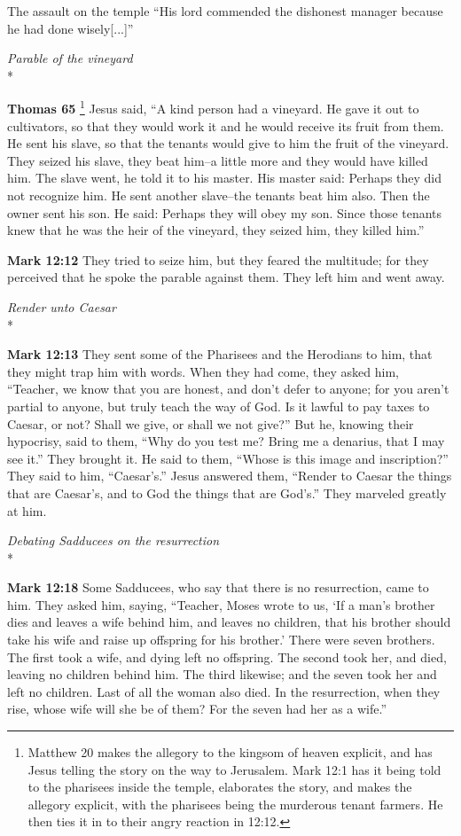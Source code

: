 \documentclass[10pt,twoside]{article} %
\newcommand{\quotesize}{\normalsize{}}
\newenvironment{quotetext}{\begingroup\quotesize}{\endgroup}
\newcommand{\intex}[1]{\index[texts]{#1}}
\newcommand{\bible}[2]{\begin{quotetext}\textbf{#1}\intex{#1} #2\end{quotetext}}
\newcommand{\gospelmark}[2]{\bible{Mark #1}{#2}}
\newcommand{\thomas}[2]{\bible{Thomas #1}{#2}}
\newcommand{\subhead}[1]{\emph{#1}\\*}
\begin{document}
\begin{section}{The assault on the temple}
{   ``His lord commended the dishonest manager because he had done wisely[...]''
}

\subhead{Parable of the vineyard}

\thomas{65}{\footnote{Matthew 20 makes the allegory to the kingsom of heaven explicit, and has Jesus telling the story on the way to Jerusalem.
Mark 12:1 has it being told to the pharisees inside the temple, 
elaborates the story, and makes the allegory explicit, with the pharisees being the murderous tenant farmers.
He then ties it in to their angry reaction in 12:12.}
Jesus said, ``A kind person had a vineyard. He gave it out to cultivators, so that
they would work it and he would receive its fruit from them. He sent
his slave, so that the tenants would give to him the fruit of the
vineyard. They seized his slave, they beat him--a little more and they
would have killed him. The slave went, he told it to his master. His
master said: Perhaps they did not recognize him. He sent another
slave--the tenants beat him also. Then the owner sent his son. He
said: Perhaps they will obey my son. Since those tenants knew that he
was the heir of the vineyard, they seized him, they killed
him.''
}

\gospelmark{12:12}{
 They tried to seize him, but they feared the multitude; for they perceived that he spoke the parable against them.
They left him and went away.
}

\subhead{Render unto Caesar}

\gospelmark{12:13}{
They sent some of the Pharisees and the Herodians to him, that they might trap him with words.   When they had come, they asked him, ``Teacher, we know that you are honest, and don't defer to anyone; for you aren't partial to anyone, but truly teach the way of God. Is it lawful to pay taxes to Caesar, or not?   Shall we give, or shall we not give?''
But he, knowing their hypocrisy, said to them, ``Why do you test me? Bring me a denarius, that I may see it.''
  They brought it.
He said to them, ``Whose is this image and inscription?''
They said to him, ``Caesar's.''
  Jesus answered them, ``Render to Caesar the things that are Caesar's, and to God the things that are God's.''
They marveled greatly at him. 
}

\subhead{Debating Sadducees on the resurrection}

\gospelmark{12:18}{
Some Sadducees, who say that there is no resurrection, came to him. They asked him, saying,   ``Teacher, Moses wrote to us, `If a man's brother dies and leaves a wife behind him, and leaves no children, that his brother should take his wife and raise up offspring for his brother.'   There were seven brothers. The first took a wife, and dying left no offspring.   The second took her, and died, leaving no children behind him. The third likewise;   and the seven took her and left no children. Last of all the woman also died.   In the resurrection, when they rise, whose wife will she be of them? For the seven had her as a wife.''

}
\end{section}
\end{document}
